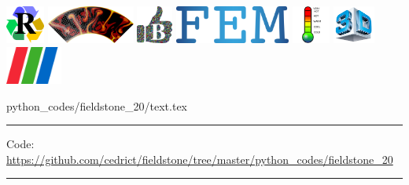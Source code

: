 \noindent
\includegraphics[height=1.25cm]{images/pictograms/replication}
\includegraphics[height=1.25cm]{images/pictograms/aspect_logo}
\includegraphics[height=1.25cm]{images/pictograms/benchmark}
\includegraphics[height=1.25cm]{images/pictograms/FEM}
\includegraphics[height=1.25cm]{images/pictograms/temperature}
\includegraphics[height=1.25cm]{images/pictograms/3d}
\includegraphics[height=1.25cm]{images/pictograms/paraview}


\begin{flushright} {\tiny {\color{gray} python\_codes/fieldstone\_20/text.tex}} \end{flushright}

\par\noindent\rule{\textwidth}{0.4pt}

\begin{center}
\inpython
{\small Code: \url{https://github.com/cedrict/fieldstone/tree/master/python_codes/fieldstone_20}}
\end{center}

\par\noindent\rule{\textwidth}{0.4pt}

